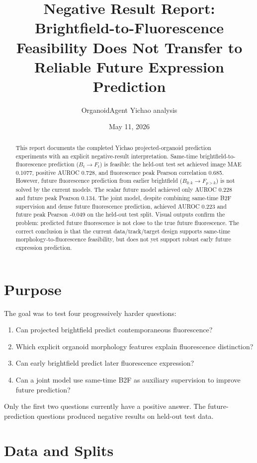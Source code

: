 \documentclass[11pt]{article}
\title{\textbf{Negative Result Report: Brightfield-to-Fluorescence Feasibility Does Not Transfer to Reliable Future Expression Prediction}}
\author{OrganoidAgent Yichao analysis}
\date{May 11, 2026}
\begin{document}
\maketitle

\begin{abstract}
This report documents the completed Yichao projected-organoid prediction experiments with an explicit negative-result interpretation. Same-time brightfield-to-fluorescence prediction ($B_t \rightarrow F_t$) is feasible: the held-out test set achieved image MAE 0.1077, positive AUROC 0.728, and fluorescence peak Pearson correlation 0.685. However, future fluorescence prediction from earlier brightfield ($B_{0:k} \rightarrow F_{p>k}$) is not solved by the current models. The scalar future model achieved only AUROC 0.228 and future peak Pearson 0.134. The joint model, despite combining same-time B2F supervision and dense future fluorescence prediction, achieved AUROC 0.223 and future peak Pearson -0.049 on the held-out test split. Visual outputs confirm the problem: predicted future fluorescence is not close to the true future fluorescence. The correct conclusion is that the current data/track/target design supports same-time morphology-to-fluorescence feasibility, but does not yet support robust early future expression prediction.
\end{abstract}

\section{Purpose}

The goal was to test four progressively harder questions:

\begin{enumerate}
\item Can projected brightfield predict contemporaneous fluorescence?
\item Which explicit organoid morphology features explain fluorescence distinction?
\item Can early brightfield predict later fluorescence expression?
\item Can a joint model use same-time B2F as auxiliary supervision to improve future prediction?
\end{enumerate}

Only the first two questions currently have a positive answer. The future-prediction questions produced negative results on held-out test data.

\section{Data and Splits}
\end{document}
